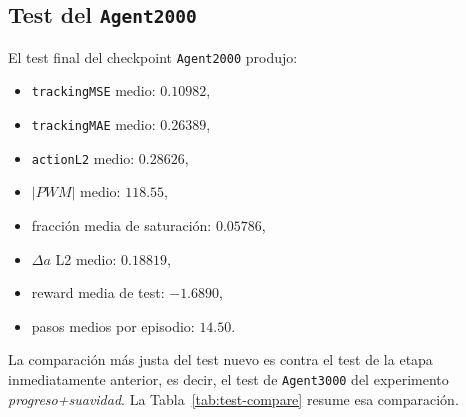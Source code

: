 \documentclass[11pt,a4paper]{article}
\begin{document}
\subsection{Test del \texttt{Agent2000}}

El test final del checkpoint \texttt{Agent2000} produjo:
\begin{itemize}[leftmargin=1.2cm]
    \item \texttt{trackingMSE} medio: \(0.10982\),
    \item \texttt{trackingMAE} medio: \(0.26389\),
    \item \texttt{actionL2} medio: \(0.28626\),
    \item \(|PWM|\) medio: \(118.55\),
    \item fracci\'on media de saturaci\'on: \(0.05786\),
    \item \(\Delta a\) L2 medio: \(0.18819\),
    \item reward media de test: \(-1.6890\),
    \item pasos medios por episodio: \(14.50\).
\end{itemize}

La comparaci\'on m\'as justa del test nuevo es contra el test de la etapa inmediatamente anterior, es decir, el test de \texttt{Agent3000} del experimento \emph{progreso+suavidad}. La Tabla~\ref{tab:test-compare} resume esa comparaci\'on.

\begin{table}[H]
\centering
\caption{Comparaci\'on de tests: etapa previa vs etapa Markoviana}
\label{tab:test-compare}
\footnotesize
\setlength{\tabcolsep}{5pt}
\renewcommand{\arraystretch}{1.15}
\normalsize
\end{table}
\end{document}
